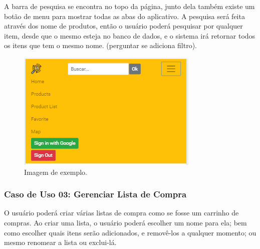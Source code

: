 A barra de pesquisa se encontra no topo da página, junto dela também existe um botão de menu para mostrar todas as abas do aplicativo. A pesquisa será feita através dos nome de produtos, então o usuário poderá pesquisar por qualquer item, desde que o mesmo esteja no banco de dados, e o sistema irá retornar todos os itens que tem o mesmo nome. (perguntar se adiciona filtro).

\begin{figure}[!htb]
\centering
\caption{Imagem de exemplo.}
\includegraphics[width=\linewidth]{figuras/tela-menu.png}
\end{figure}

\subsubsection{Caso de Uso 03: Gerenciar Lista de Compra}

O usuário poderá criar várias listas de compra como se fosse um carrinho de compras. Ao criar uma lista, o usuário poderá escolher um nome para ela; bem como escolher quais itens serão adicionados, e removê-los a qualquer momento; ou mesmo renomear a lista ou exclui-lá.

